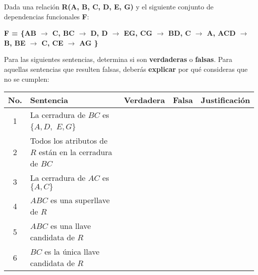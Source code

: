 Dada una relación \textbf{R(A, B, C, D, E, G)} y el siguiente conjunto de dependencias funcionales \textbf{F}:

\begin{center}
    \textbf{F = \{AB $\rightarrow$ C, BC $\rightarrow$ D, D $\rightarrow$ EG, CG $\rightarrow$ BD, C $\rightarrow$ A, ACD $\rightarrow$ B, BE $\rightarrow$ C, CE $\rightarrow$ AG \}} 
\end{center}

Para las siguientes sentencias, determina si son \textbf{verdaderas} o \textbf{falsas}. Para aquellas sentencias que resulten falsas, deberás \textbf{explicar} por qué consideras que no se cumplen:

\begin{table}[h!]
    \centering
    \renewcommand{\arraystretch}{1.5}
    \begin{tabular}{|c|m{5cm}|c|c|m{6cm}|}
    \hline
    \textbf{No.} & \textbf{Sentencia} & \textbf{Verdadera} & \textbf{Falsa} & \textbf{Justificación} \\ \hline
    1 & La cerradura de $BC$ es $\{A, D,$ $ E, G\}$ & & & \\ \hline
    2 & Todos los atributos de $R$ están en la cerradura de $BC$ & & & \\ \hline
    3 & La cerradura de $AC$ es $\{A, C\}$ & & & \\ \hline
    4 & $ABC$ es una superllave de $R$ & & & \\ \hline
    5 & $ABC$ es una llave candidata de $R$ & & & \\ \hline
    6 & $BC$ es la única llave candidata de $R$ & & & \\ \hline
    \end{tabular}
\end{table}
